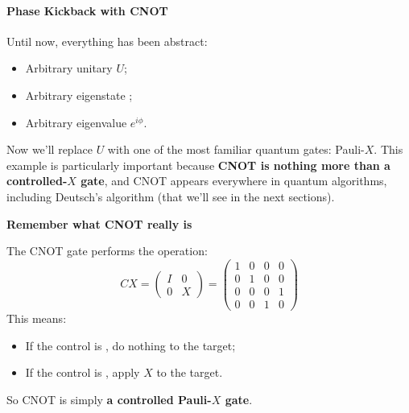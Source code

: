 \paragraph{Phase Kickback with CNOT}\label{ex:phase-kickback-with-cnot}

Until now, everything has been abstract:
\begin{itemize}
    \item Arbitrary unitary $U$;
    \item Arbitrary eigenstate ;
    \item Arbitrary eigenvalue $e^{i\phi}$.
\end{itemize}
Now we'll replace $U$ with one of the most familiar quantum gates: Pauli-$X$. This example is particularly important because \textbf{CNOT is nothing more than a controlled-$X$ gate}, and CNOT appears everywhere in quantum algorithms, including Deutsch's algorithm (that we'll see in the next sections).

\highspace
\begin{flushleft}
    \textcolor{Green3}{ \textbf{Remember what CNOT really is}}
\end{flushleft}
The CNOT gate performs the operation:
\begin{equation*}
    CX = \begin{pmatrix}
        I & 0 \\
        0 & X
    \end{pmatrix} =
    \begin{pmatrix}
        1 & 0 & 0 & 0 \\
        0 & 1 & 0 & 0 \\
        0 & 0 & 0 & 1 \\
        0 & 0 & 1 & 0
    \end{pmatrix}
\end{equation*}
This means:
\begin{itemize}
    \item If the control is , do nothing to the target;
    \item If the control is , apply $X$ to the target.
\end{itemize}
So CNOT is simply \textbf{a controlled Pauli-$X$ gate}.


